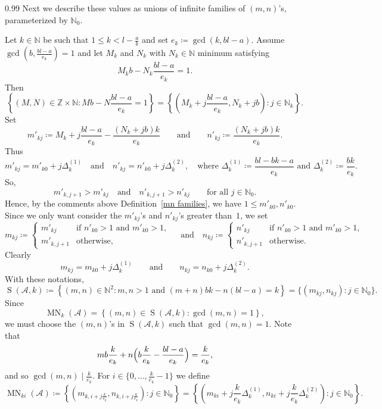 \documentclass[reqno,a4paper,twoside]{amsart}
\theoremstyle{definition}
\theoremstyle{remark}
\DeclareMathOperator{\Ss}{S}
\DeclareMathOperator{\MN}{MN}
\begin{document}
\begin{spacing}{0.99}
Next we describe these values as unions of infinite families of $(m,n)$'s, parameterized by $\mathds{N}_0$.

\smallskip

Let $k\in \mathds{N}$ be such that $1\le k<l- \frac{a}{b}$ and set $e_k\coloneqq \gcd(k,bl-a)$. Assume $\gcd\left(b,\frac{bl-a}{e_k}\right)=1$ and let $M_k$ and $N_k$ with $N_k\in \mathds{N}$ minimum satisfying
$$
M_kb-N_k\frac{bl-a}{e_k}=1.
$$
Then
$$
\left\{(M,N)\in \mathds{Z}\times \mathds{N}:Mb-N\frac{bl-a}{e_k}=1\right\} = \left\{\left(M_k+j\frac{bl-a}{e_k},N_k+jb\right): j\in \mathds{N}_k\right\}.
$$
Set
$$
m'_{kj}\coloneqq M_k+j\frac{bl-a}{e_k} - \frac{(N_k+jb)k}{e_k} \qquad\text{and}\qquad n'_{kj}\coloneqq \frac{(N_k+jb)k}{e_k}.
$$
Thus
$$
m'_{kj} = m'_{k0} + j\Delta_k^{\!(1)} \quad\text{and}\quad n'_{kj} = n'_{k0} + j\Delta_k^{\!(2)},\quad\text{where $\Delta_k^{\!(1)}\coloneqq \frac{bl-bk-a}{e_k}$ and $\Delta_k^{\!(2)}\coloneqq \frac{bk}{e_k}$}.
$$
So,
$$
m'_{k,j+1}>m'_{kj}\quad\text{and}\quad n'_{k,j+1}>n'_{kj}\qquad\text{for all $j\in \mathds{N}_0$.}
$$
Hence, by the comments above Definition~\ref{mn families},
we have $1\le m'_{k0},n'_{k0}$. Since we only want consider the $m'_{kj}$'s and $n'_{kj}$'s greater than~$1$, we set
$$
m_{kj} \coloneqq \begin{cases} m'_{kj} & \text{if $n'_{k0}>1$ and $m'_{k0}>1$, }\\ m'_{k,j+1} &\text{otherwise,}\end{cases}\quad\text{and}\quad n_{kj} \coloneqq \begin{cases} n'_{kj} & \text{if $n'_{k0}>1$ and $m'_{k0}>1$, }\\ n'_{k,j+1} & \text{otherwise.}\end{cases}
$$
Clearly
\begin{equation}\label{eq10}
m_{kj} = m_{k0} + j\Delta_k^{\!(1)} \qquad\text{and}\qquad n_{kj} = n_{k0} + j\Delta_k^{\!(2)}.
\end{equation}
With these notations,
$$
\Ss(\mathcal{A},k)\coloneqq \left\{(m,n)\in \mathds{N}^2 : m,n>1\text{ and } (m+n)bk-n(bl-a)=k  \right\}=\{(m_{kj},n_{kj}) : j\in \mathds{N}_0\}.
$$
Since
$$
\MN_k(\mathcal{A}) =  \left\{(m,n)\in \Ss(\mathcal{A},k) : \gcd(m,n)= 1\right\},
$$
we must choose the $(m,n)$'s in $\Ss(\mathcal{A},k)$ such that $\gcd(m,n)=1$. Note that
$$
mb\frac{k}{e_k}+ n\Bigl(b\frac{k}{e_k}-\frac{bl-a}{e_k}\Bigr)=\frac{k}{e_k},
$$
and so $\gcd(m,n)\mid \frac{k}{e_k}$. For  $i\in \bigl\{0,\dots,\frac{k}{e_k}-1\bigr\}$ we define
$$
\MN_{ki}(\mathcal{A})\coloneqq \left\{\left(m_{k,i+j\frac{k}{e_k}},n_{k,i+j\frac{k}{e_k}}\right): j\in \mathds{N}_0 \right\} =  \left\{\left(m_{ki}+j\frac{k}{e_k}\Delta_k^{\!(1)},n_{ki}+j \frac{k}{e_k} \Delta_k^{\!(2)}\right): j\in \mathds{N}_0 \right\}.
$$


\end{spacing}
\end{document}
